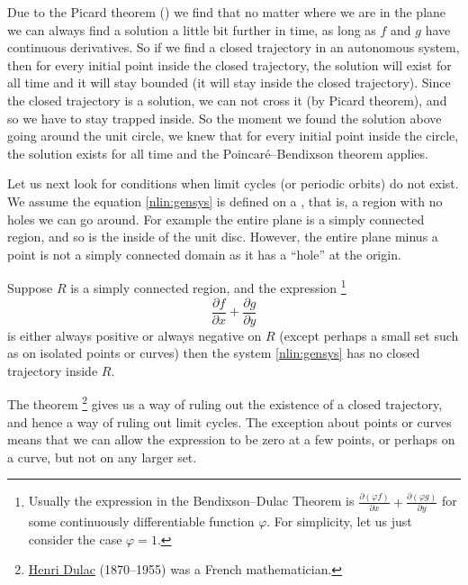 \documentclass{ximera}
\begin{document}
Due to the Picard theorem () we find that no matter where we are in the plane we can always find a solution a little bit further in time, as long as $f$ and $g$ have continuous derivatives.  So if we find a closed trajectory in an autonomous system, then for every initial point inside the closed trajectory, the solution will exist for all time and it will stay bounded (it will stay inside the closed trajectory). Since the closed trajectory is a solution, we can not cross it (by Picard theorem), and so we have to stay trapped inside. So the moment we found the solution above going around the unit circle, we knew that for every initial point inside the circle, the solution exists for all time and the Poincar\'e--Bendixson theorem applies.

Let us next look for conditions when limit cycles (or periodic orbits) do not exist. We assume the equation \eqref{nlin:gensys} is defined on a \emph{}, that is, a region with no holes we can go around.  For example the entire plane is a simply connected region, and so is the inside of the unit disc.  However, the entire plane minus a point is not a simply connected domain as it has a ``hole'' at the origin.

\begin{theorem}%
    \label{thm:BD}%
    Suppose $R$ is a simply connected region, and the expression%
    \footnote{
        Usually the expression in the Bendixson--Dulac Theorem is $\frac{\partial (\varphi f)}{\partial x} + \frac{\partial (\varphi g)}{\partial y}$ for some continuously differentiable function $\varphi$.  For simplicity, let us just consider the case $\varphi = 1$.
        }
    \begin{equation*}
        \frac{\partial f}{\partial x} + \frac{\partial g}{\partial y}
    \end{equation*}
    is either always positive or always negative on $R$ (except perhaps a small set such as on isolated points or curves) then the system \eqref{nlin:gensys} has no closed trajectory inside $R$.
\end{theorem}

The theorem%
\footnote{\href{https://en.wikipedia.org/wiki/Henri_Dulac}{Henri Dulac} (1870--1955) was a French mathematician.} 
gives us a way of ruling out the existence of a closed trajectory, and hence a way of ruling out limit cycles. The exception about points or curves means that we can allow the expression to be zero at a few points, or perhaps on a curve, but not on any larger set.
\end{document}
